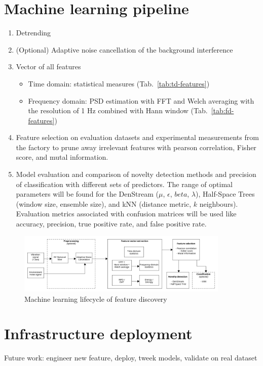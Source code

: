 \section{Machine learning pipeline}
\begin{enumerate}
    \itemsep0pt
    \item Detrending
    \item (Optional) Adaptive noise cancellation of the background interference
    \item Vector of all features
    \begin{itemize}
        \itemsep0pt
        \item Time domain: statistical measures (Tab.~\ref{tab:td-features})
        \item Frequency domain: PSD estimation with FFT and Welch averaging with the resolution of 1 Hz combined with Hann window (Tab.~\ref{tab:fd-features})
    \end{itemize}
    \item Feature selection on evaluation datasets and experimental measurements from the factory to prune away irrelevant features with pearson correlation, Fisher score, and mutal information.
    \item Model evaluation and comparison of novelty detection methods and precision of classification with different sets of predictors. The range of optimal parameters will be found for the DenStream ($\mu$, $\epsilon$, $beta$, $\lambda$), Half-Space Trees (window size, ensemble size), and kNN (distance metric, $k$ neighbours). Evaluation metrics associated with confusion matrices will be used like accuracy, precision, true positive rate, and false positive rate.
\end{enumerate}

\begin{figure}[h]
\centering
\includegraphics[width=0.9\textwidth]{assets/analysis/ml-lifecycle.png}
\caption{Machine learning lifecycle of feature discovery}
\end{figure}


\section{Infrastructure deployment}
Future work: engineer new feature, deploy, tweek models, validate on real dataset

